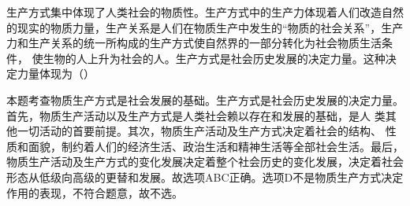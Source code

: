 \question 生产方式集中体现了人类社会的物质性。生产方式中的生产力体现着人们改造自然的现实的物质力量，生产关系是人们在物质生产中发生的``物质的社会关系''，生产
力和生产关系的统一所构成的生产方式使自然界的一部分转化为社会物质生活条件，
使生物的人上升为社会的人。生产方式是社会历史发展的决定力量。这种决定力量体现为（）
\par{}
\begin{solution}本题考查物质生产方式是社会发展的基础。生产方式是社会历史发展的决定力量。首先，物质生产活动以及生产方式是人类社会赖以存在和发展的基础，是人
类其他一切活动的首要前提。其次，物质生产活动及生产方式决定着社会的结构、
性质和面貌，制约着人们的经济生活、政治生活和精神生活等全部社会生活。最后，
物质生产活动及生产方式的变化发展决定着整个社会历史的变化发展，决定着社会
形态从低级向高级的更替和发展。故选项ABC正确。选项D不是物质生产方式决定
作用的表现，不符合题意，故不选。
\end{solution}

